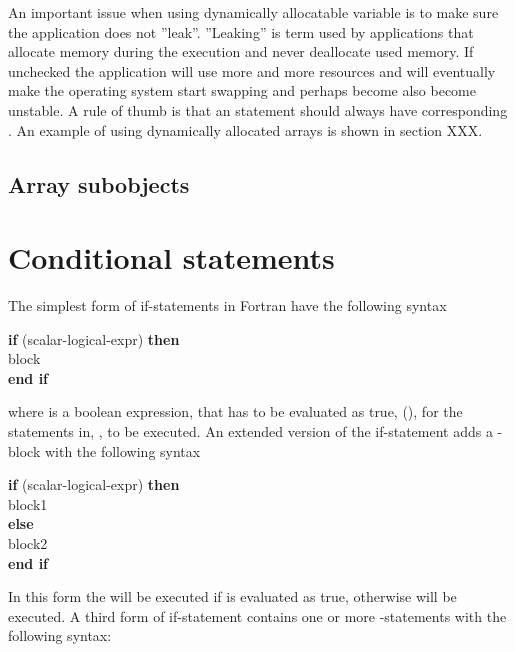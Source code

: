 An important issue when using dynamically allocatable variable is to make sure the application does not ''leak''. ''Leaking'' is term used by applications that allocate memory during the execution and never deallocate used memory. If unchecked the application will use more and more resources and will eventually make the operating system start swapping and perhaps become also become unstable. A rule of thumb is that an
 statement should always have corresponding . An example of using dynamically allocated arrays is shown in section XXX.

\subsection{Array subobjects}

\section{Conditional statements}

The simplest form of if-statements in Fortran have the following syntax

\begin{fsyntax}
\textbf{if} (scalar-logical-expr) \textbf{then}\\
\ftab  block\\
\textbf{end if}\\
\end{fsyntax}

where  is a boolean expression, that has to be evaluated as true, (), for the statements in, , to be executed. An extended version of the if-statement adds a -block with the following syntax

\begin{fsyntax}
\textbf{if} (scalar-logical-expr) \textbf{then}\\
\ftab block1\\
\textbf{else}\\
\ftab block2\\
\textbf{end if}\\
\end{fsyntax}

In this form the  will be executed if  is evaluated as true, otherwise  will be executed. A third form of if-statement contains one or more -statements with the following syntax:

